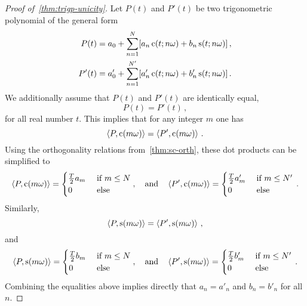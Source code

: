 \begin{proof}[Proof of~\cref{thm:trigp-unicity}]
  Let $P(t)$ and $P'(t)$ be two trigonometric polynomial of the general form
  \begin{align}
    P(t)&=a_0+\sum_{n=1}^N[a_n\,\mathrm{c}(t;n\omega)+b_n\,\mathrm{s}(t;n\omega)]\,,\\
    P'(t)&=a'_0+\sum_{n=1}^{N'}[a'_n\,\mathrm{c}(t;n\omega)+b'_n\,\mathrm{s}(t;n\omega)]\,.
  \end{align}
  We additionally assume that $P(t)$ and $P'(t)$ are identically equal, \ie
  \begin{equation}
    P(t)=P'(t)\,,
  \end{equation}
  for all real number $t$. This implies that for any integer $m$ one has
  \begin{equation}
    \braket{P,\mathrm{c}(m\omega)}=\braket{P',\mathrm{c}(m\omega)}\,.
  \end{equation}
  Using the orthogonality relations from~\cref{thm:sc-orth}, these dot products can be simplified to
  \begin{equation}
    \braket{P,\mathrm{c}(m\omega)}=
    \begin{cases}
      \frac{T}{2}a_m&~\text{if}~m\leq N\\
      0&~\text{else}
    \end{cases},
    \quad\text{and}\quad
    \braket{P',\mathrm{c}(m\omega)}=
    \begin{cases}
      \frac{T}{2}a'_m&~\text{if}~m\leq N'\\
      0&~\text{else}
    \end{cases}\,.
  \end{equation}
  Similarly,
  \begin{equation}
    \braket{P,\mathrm{s}(m\omega)}=\braket{P',\mathrm{s}(m\omega)}\,,
  \end{equation}
  and
  \begin{equation}
    \braket{P,\mathrm{s}(m\omega)}=
    \begin{cases}
      \frac{T}{2}b_m&~\text{if}~m\leq N\\
      0&~\text{else}
    \end{cases},
    \quad\text{and}\quad
    \braket{P',\mathrm{s}(m\omega)}=
    \begin{cases}
      \frac{T}{2}b'_m&~\text{if}~m\leq N'\\
      0&~\text{else}
    \end{cases}\,.
  \end{equation}
  Combining the equalities above implies directly that $a_n=a'_n$ and $b_n=b'_n$ for all $n$.
\end{proof}
